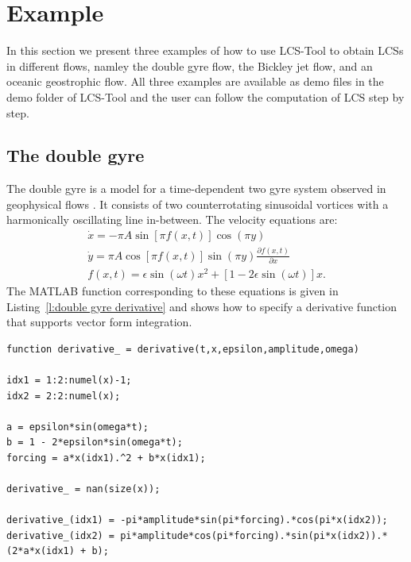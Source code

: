 \documentclass{article}
\begin{document}
\section{Example}
In this section we present three examples of how to use LCS-Tool to obtain LCSs in different flows, namley the double gyre flow, the Bickley jet flow, and an oceanic geostrophic flow. All three examples are available as demo files in the demo folder of LCS-Tool and the user can follow the computation of LCS step by step.

\subsection{The double gyre}
The double gyre is a model for a time-dependent two gyre system observed in geophysical flows \parencite{shadden05:_defin_lagran_lyapun}. It consists of two counterrotating sinusoidal vortices with a harmonically oscillating line in-between.
The velocity equations are:
\begin{equation}
\begin{split}
\dot x = -\pi A \sin[\pi f(x,t)] \cos(\pi y)\\
\dot y = \pi A \cos[\pi f(x,t)] \sin(\pi y) \frac{\partial f(x,t)}{\partial x}\\
f(x,t) = \epsilon \sin(\omega t) x^2 + [1 - 2 \epsilon \sin(\omega t)] x.
\end{split}
\label{eq:double gyre derivative equations}
\end{equation}
The MATLAB function corresponding to these equations is given in Listing~\ref{l:double gyre derivative} and shows how to specify a derivative function that supports vector form integration.

\begin{lstlisting}[caption={Double gyre derivative function corresponding to Equations~\ref{eq:double gyre derivative equations}.},label=l:double gyre derivative]
function derivative_ = derivative(t,x,epsilon,amplitude,omega)

idx1 = 1:2:numel(x)-1;
idx2 = 2:2:numel(x);

a = epsilon*sin(omega*t);
b = 1 - 2*epsilon*sin(omega*t);
forcing = a*x(idx1).^2 + b*x(idx1);

derivative_ = nan(size(x));

derivative_(idx1) = -pi*amplitude*sin(pi*forcing).*cos(pi*x(idx2));
derivative_(idx2) = pi*amplitude*cos(pi*forcing).*sin(pi*x(idx2)).*(2*a*x(idx1) + b);
\end{lstlisting}
\end{document}
